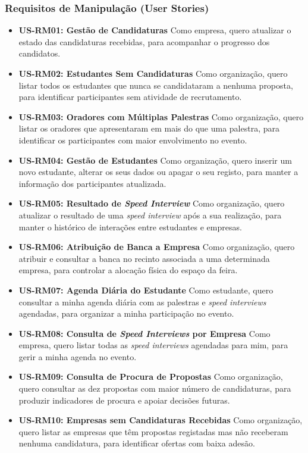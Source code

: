 \documentclass[12pt,a4paper]{article}
\begin{document}
\subsubsection{Requisitos de Manipulação (User Stories)}

\begin{itemize}[leftmargin=1.5cm]
   
    \item \textbf{US-RM01: Gestão de Candidaturas} Como empresa, quero atualizar o estado das candidaturas recebidas, para acompanhar o progresso dos candidatos.
    \item \textbf{US-RM02: Estudantes Sem Candidaturas} Como organização,
    quero listar todos os estudantes que nunca se candidataram a nenhuma proposta,
    para identificar participantes sem atividade de recrutamento.
 

    \item \textbf{US-RM03: Oradores com Múltiplas Palestras} Como organização, quero listar os oradores que apresentaram em mais do que uma palestra, para identificar os participantes com maior envolvimento no evento.


    \item \textbf{US-RM04: Gestão de Estudantes} Como organização, quero inserir um novo estudante, alterar os seus dados ou apagar o seu registo, para manter a informação dos participantes atualizada.
 

    \item \textbf{US-RM05: Resultado de \textit{Speed Interview}} Como organização, quero atualizar o resultado de uma \textit{speed interview} após a sua realização, para manter o histórico de interações entre estudantes e empresas.


    \item \textbf{US-RM06: Atribuição de Banca a Empresa} Como organização, quero atribuir e consultar a banca no recinto associada a uma determinada empresa, para controlar a alocação física do espaço da feira.


    \item \textbf{US-RM07: Agenda Diária do Estudante} Como estudante, quero consultar a minha agenda diária com as palestras e \textit{speed interviews} agendadas, para organizar a minha participação no evento.


    \item \textbf{US-RM08: Consulta de \textit{Speed Interviews} por Empresa} Como empresa, quero listar todas as \textit{speed interviews} agendadas para mim, para gerir a minha agenda no evento.


    \item \textbf{US-RM09: Consulta de Procura de Propostas} Como organização, quero consultar as dez propostas com maior número de candidaturas, para produzir indicadores de procura e apoiar decisões futuras.


    \item \textbf{US-RM10: Empresas sem Candidaturas Recebidas} Como organização, quero listar as empresas que têm propostas registadas mas não receberam nenhuma candidatura, para identificar ofertas com baixa adesão.

\end{itemize}
\end{document}
